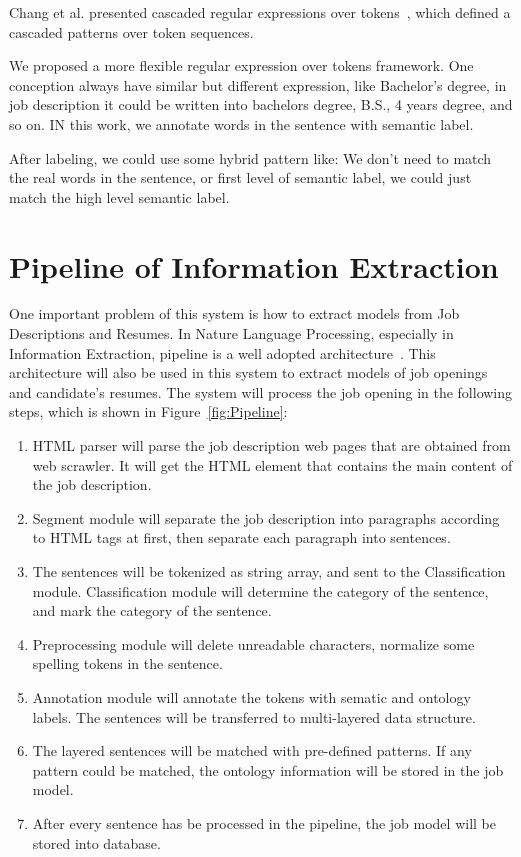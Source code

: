 Chang et al. presented cascaded regular expressions over tokens~\cite{chang2014tokensregex}, which defined a cascaded patterns over token sequences.

We proposed a more flexible regular expression over tokens framework.
One conception always have similar but different expression, like Bachelor's degree, in job description it could be written into bachelors degree, B.S., 4 years degree, and so on. IN this work, we annotate words in the sentence with semantic label.

After labeling, we could use some hybrid pattern like: 
We don't need to match the real words in the sentence, or first level of semantic label, we could just match the high level semantic label.











\section{Pipeline of Information Extraction}

One important problem of this system is how to extract models from Job Descriptions and Resumes.
In Nature Language Processing, especially in Information Extraction, pipeline is a well adopted architecture~\cite{sarawagi2008information}. This architecture will also be used in this system to extract models of job openings and candidate's resumes. The system will process the job opening in the following steps, which is shown in Figure~\ref{fig:Pipeline}:

\begin{enumerate}
    \item HTML parser will parse the job description web pages that are obtained from web scrawler. It will get the HTML element that contains the main content of the job description.
    \item Segment module will separate the job description into paragraphs according to HTML tags at first, then separate each paragraph into sentences.
    \item The sentences will be tokenized as string array, and sent to the Classification module. Classification module will determine the category of the sentence, and mark the category of the sentence.
    \item Preprocessing module will delete unreadable characters, normalize some spelling tokens in the sentence.
    \item Annotation module will annotate the tokens with sematic and ontology labels. The sentences will be transferred to multi-layered data structure.
    \item The layered sentences will be matched with pre-defined patterns. If any pattern could be matched, the ontology information will be stored in the job model.
    \item After every sentence has be processed in the pipeline, the job model will be stored into database.
\end{enumerate}


